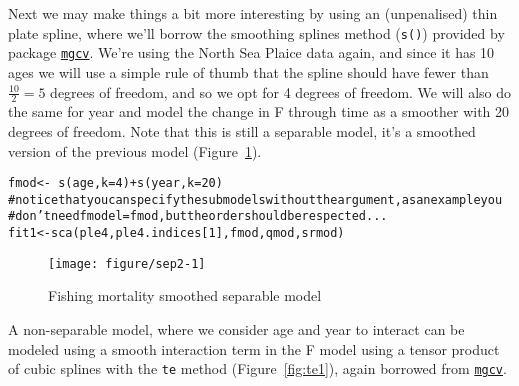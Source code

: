 \documentclass[a4paper,english,10pt]{article}\usepackage[]{graphicx}\usepackage[]{color}
\makeatletter
\def\maxwidth{ %
  \ifdim\Gin@nat@width>\linewidth
    \linewidth
  \else
    \Gin@nat@width
  \fi
}
\newcommand{\hlnum}[1]{\textcolor[rgb]{0.2,0.2,0.2}{#1}}%
\newcommand{\hlcom}[1]{\textcolor[rgb]{0.2,0.267,0.4}{#1}}%
\newcommand{\hlopt}[1]{\textcolor[rgb]{0.2,0.2,0.2}{#1}}%
\newcommand{\hlstd}[1]{\textcolor[rgb]{0,0,0}{#1}}%
\newcommand{\hlkwb}[1]{\textcolor[rgb]{0.361,0.506,0.596}{#1}}%
\newcommand{\hlkwc}[1]{\textcolor[rgb]{0.361,0.506,0.596}{#1}}%
\newcommand{\hlkwd}[1]{\textcolor[rgb]{0.361,0.506,0.596}{#1}}%
\newenvironment{kframe}{%
 \def\at@end@of@kframe{}%
 \ifinner\ifhmode%
  \def\at@end@of@kframe{\end{minipage}}%
  \begin{minipage}{\columnwidth}%
 \fi\fi%
 \def\FrameCommand##1{\hskip\@totalleftmargin \hskip-\fboxsep
 \colorbox{shadecolor}{##1}\hskip-\fboxsep
     \hskip-\linewidth \hskip-\@totalleftmargin \hskip\columnwidth}%
 \MakeFramed {\advance\hsize-\width
   \@totalleftmargin\z@ \linewidth\hsize
   \@setminipage}}%
 {\par\unskip\endMakeFramed%
 \at@end@of@kframe}
\newenvironment{knitrout}{}{} %
\newcommand{\code}[1]{{\texttt{#1}}}
\newcommand{\pkg}[1]{{\texttt{#1}}}
\makeatother
\begin{document}
Next we may make things a bit more interesting by using an (unpenalised) thin plate spline, where we'll borrow the smoothing splines method (\code{s()}) provided by package \href{http://cran.r-project.org/web/packages/mgcv/}{\pkg{mgcv}}. We're using the North Sea Plaice data again, and since it has 10 ages we will use a simple rule of thumb that the spline should have fewer than $\frac{10}{2} = 5$ degrees of freedom, and so we opt for 4 degrees of freedom. We will also do the same for year and model the change in F through time as a smoother with 20 degrees of freedom. Note that this is still a separable model, it's a smoothed version of the previous model (Figure~\ref{fig:sep2}).

\begin{knitrout}
\color{fgcolor}\begin{kframe}
\begin{alltt}
\hlstd{fmod} \hlkwb{<-} \hlopt{~} \hlkwd{s}\hlstd{(age,} \hlkwc{k}\hlstd{=}\hlnum{4}\hlstd{)} \hlopt{+} \hlkwd{s}\hlstd{(year,} \hlkwc{k} \hlstd{=} \hlnum{20}\hlstd{)}
\hlcom{# notice that you can specify the submodels without the argument, as an example you }
\hlcom{# don't need fmodel=fmod, but the order should be respected...}
\hlstd{fit1} \hlkwb{<-} \hlkwd{sca}\hlstd{(ple4, ple4.indices[}\hlnum{1}\hlstd{], fmod, qmod, srmod)}
\end{alltt}
\end{kframe}
\end{knitrout}

\begin{knitrout}
\color{fgcolor}\begin{figure}[H]

{\centering \texttt{[image: figure/sep2-1]} 

}

\caption[Fishing mortality smoothed separable model]{Fishing mortality smoothed separable model}\label{fig:sep2}
\end{figure}


\end{knitrout}

A non-separable model, where we consider age and year to interact can be modeled using a smooth interaction term in the F model using a tensor product of cubic splines with the \code{te} method (Figure~\ref{fig:te1}), again borrowed from \href{http://cran.r-project.org/web/packages/mgcv/index.html}{\pkg{mgcv}}. 
\end{document}
